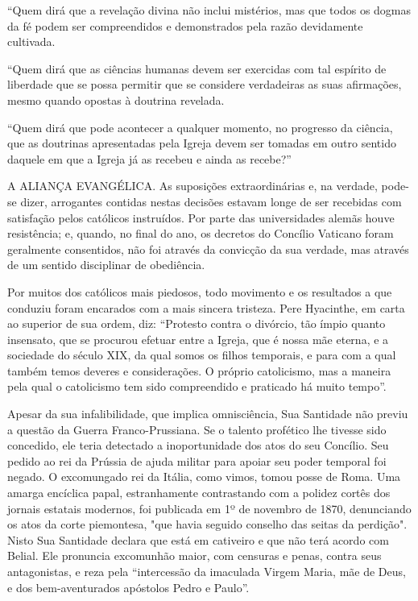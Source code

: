 \documentclass[11pt,a5paper,twoside,openany]{book}
\begin{document}
“Quem dirá que a revelação divina não inclui mistérios, mas que todos os dogmas da fé podem ser compreendidos e demonstrados pela razão devidamente cultivada.

“Quem dirá que as ciências humanas devem ser exercidas com tal espírito de liberdade que se possa permitir que se considere verdadeiras as suas afirmações, mesmo quando opostas à doutrina revelada.

“Quem dirá que pode acontecer a qualquer momento, no progresso da ciência, que as doutrinas apresentadas pela Igreja devem ser tomadas em outro sentido daquele em que a Igreja já as recebeu e ainda as recebe?”

A ALIANÇA EVANGÉLICA. As suposições extraordinárias e, na verdade, pode-se dizer, arrogantes contidas nestas decisões estavam longe de ser recebidas com satisfação pelos católicos instruídos. Por parte das universidades alemãs houve resistência; e, quando, no final do ano, os decretos do Concílio Vaticano foram geralmente consentidos, não foi através da convicção da sua verdade, mas através de um sentido disciplinar de obediência.

Por muitos dos católicos mais piedosos, todo movimento e os resultados a que conduziu foram encarados com a mais sincera tristeza. Pere Hyacinthe, em carta ao superior de sua ordem, diz: “Protesto contra o divórcio, tão ímpio quanto insensato, que se procurou efetuar entre a Igreja, que é nossa mãe eterna, e a sociedade do século XIX, da qual somos os filhos temporais, e para com a qual também temos deveres e considerações. O próprio catolicismo, mas a maneira pela qual o catolicismo tem sido compreendido e praticado há muito tempo”.

Apesar da sua infalibilidade, que implica omnisciência, Sua Santidade não previu a questão da Guerra Franco-Prussiana. Se o talento profético lhe tivesse sido concedido, ele teria detectado a inoportunidade dos atos do seu Concílio. Seu pedido ao rei da Prússia de ajuda militar para apoiar seu poder temporal foi negado. O excomungado rei da Itália, como vimos, tomou posse de Roma. Uma amarga encíclica papal, estranhamente contrastando com a polidez cortês dos jornais estatais modernos, foi publicada em 1º de novembro de 1870, denunciando os atos da corte piemontesa, "que havia seguido conselho das seitas da perdição". Nisto Sua Santidade declara que está em cativeiro e que não terá acordo com Belial. Ele pronuncia excomunhão maior, com censuras e penas, contra seus antagonistas, e reza pela “intercessão da imaculada Virgem Maria, mãe de Deus, e dos bem-aventurados apóstolos Pedro e Paulo”.
\end{document}
